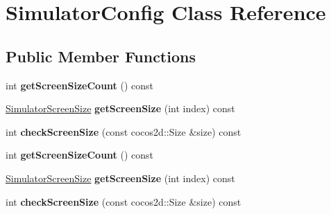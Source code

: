 \hypertarget{classSimulatorConfig}{}\section{Simulator\+Config Class Reference}
\label{classSimulatorConfig}
\subsection*{Public Member Functions}
\begin{DoxyCompactItemize}
\item 
\mbox{\label{classSimulatorConfig_a56d266f830e4a1537a8078f80de55570}} 
int {\bfseries get\+Screen\+Size\+Count} () const
\item 
\mbox{\label{classSimulatorConfig_a0a2cc33b06d09c2c95ef567338c98da0}} 
\hyperlink{struct__SimulatorScreenSize}{Simulator\+Screen\+Size} {\bfseries get\+Screen\+Size} (int index) const
\item 
\mbox{\label{classSimulatorConfig_a9b7448acd87ed4bd3e6aa0e13357ce87}} 
int {\bfseries check\+Screen\+Size} (const cocos2d\+::\+Size \&size) const
\item 
\mbox{\label{classSimulatorConfig_a56d266f830e4a1537a8078f80de55570}} 
int {\bfseries get\+Screen\+Size\+Count} () const
\item 
\mbox{\label{classSimulatorConfig_a0a2cc33b06d09c2c95ef567338c98da0}} 
\hyperlink{struct__SimulatorScreenSize}{Simulator\+Screen\+Size} {\bfseries get\+Screen\+Size} (int index) const
\item 
\mbox{\label{classSimulatorConfig_a9b7448acd87ed4bd3e6aa0e13357ce87}} 
int {\bfseries check\+Screen\+Size} (const cocos2d\+::\+Size \&size) const
\end{DoxyCompactItemize}

